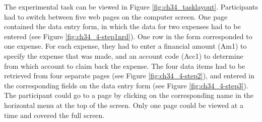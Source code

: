 \begin{table}
\begin{itemize}
The experimental task can be viewed in Figure \ref{fig:ch34_tasklayout}. Participants had to switch between five web pages on the computer screen. One page contained the data entry form, in which the data for two expenses had to be entered (see Figure \ref{fig:ch34_4-step1nrd}). One row in the form corresponded to one expense. For each expense, they had to enter a financial amount (Am1) to specify the expense that was made, and an account code (Acc1) to determine from which account to claim back the expense. 
The four data items had to be retrieved from four separate pages (see Figure \ref{fig:ch34_4-step2}), and entered in the corresponding fields on the data entry form (see Figure \ref{fig:ch34_4-step3}). The participant could go to a page by clicking on the corresponding name in the horizontal menu at the top of the screen. Only one page could be viewed at a time and covered the full screen. 


\end{itemize}
\end{table}
